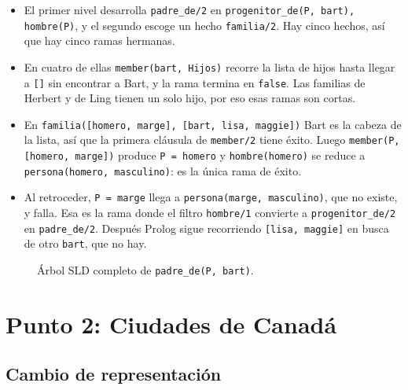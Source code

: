 \documentclass[12pt]{report}
\begin{document}
\begin{itemize}
    \item El primer nivel desarrolla \texttt{padre\_de/2} en
          \texttt{progenitor\_de(P, bart), hombre(P)}, y el segundo
          escoge un hecho \texttt{familia/2}. Hay cinco hechos, así que
          hay cinco ramas hermanas.
    \item En cuatro de ellas \texttt{member(bart, Hijos)} recorre la lista
          de hijos hasta llegar a \texttt{[]} sin encontrar a Bart, y la
          rama termina en \texttt{false}. Las familias de Herbert y de Ling
          tienen un solo hijo, por eso esas ramas son cortas.
    \item En \texttt{familia([homero, marge], [bart, lisa, maggie])} Bart
          es la cabeza de la lista, así que la primera cláusula de
          \texttt{member/2} tiene éxito. Luego
          \texttt{member(P, [homero, marge])} produce \texttt{P = homero}
          y \texttt{hombre(homero)} se reduce a
          \texttt{persona(homero, masculino)}: es la única rama de éxito.
    \item Al retroceder, \texttt{P = marge} llega a
          \texttt{persona(marge, masculino)}, que no existe, y falla. Esa
          es la rama donde el filtro \texttt{hombre/1} convierte a
          \texttt{progenitor\_de/2} en \texttt{padre\_de/2}. Después Prolog
          sigue recorriendo \texttt{[lisa, maggie]} en busca de otro
          \texttt{bart}, que no hay.
\end{itemize}

\begin{landscape}
\begin{figure}[p]
    \centering
    \caption{Árbol SLD completo de \texttt{padre\_de(P, bart)}.}
\end{figure}
\end{landscape}

\newpage


\chapter{Punto 2: Ciudades de Canadá}

\section{Cambio de representación}
\end{document}
